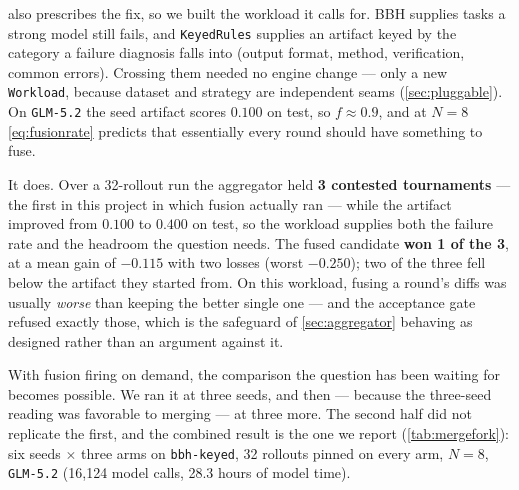 \documentclass{article}
\newcommand{\code}[1]{\texttt{#1}}
\begin{document}
 also prescribes the fix, so we built the workload it calls for. BBH \citep{suzgun2023bbh} supplies tasks a strong model still fails, and \code{KeyedRules} supplies an artifact keyed by the category a failure diagnosis falls into (output format, method, verification, common errors). Crossing them needed no engine change --- only a new \code{Workload}, because dataset and strategy are independent seams (\cref{sec:pluggable}). On \code{GLM-5.2} the seed artifact scores $0.100$ on test, so $f \approx 0.9$, and at $N{=}8$ \cref{eq:fusionrate} predicts that essentially every round should have something to fuse.

It does. Over a 32-rollout run the aggregator held \textbf{3 contested tournaments} --- the first in this project in which fusion actually ran --- while the artifact improved from $0.100$ to $0.400$ on test, so the workload supplies both the failure rate and the headroom the question needs. The fused candidate \textbf{won 1 of the 3}, at a mean gain of $-0.115$ with two losses (worst $-0.250$); two of the three fell below the artifact they started from. On this workload, fusing a round's diffs was usually \emph{worse} than keeping the better single one --- and the acceptance gate refused exactly those, which is the safeguard of \cref{sec:aggregator} behaving as designed rather than an argument against it.

With fusion firing on demand, the comparison the question has been waiting for becomes possible. We ran it at three seeds, and then --- because the three-seed reading was favorable to merging --- at three more. The second half did not replicate the first, and the combined result is the one we report (\cref{tab:mergefork}): six seeds $\times$ three arms on \code{bbh-keyed}, 32 rollouts pinned on every arm, $N{=}8$, \code{GLM-5.2} (16{,}124 model calls, 28.3 hours of model time).
\end{document}
